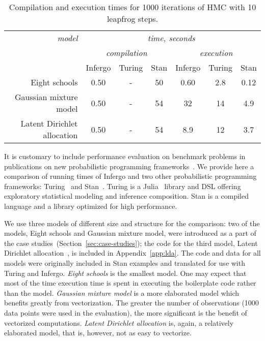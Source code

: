 \documentclass[sigplan,review,10pt,anonymous]{acmart}
\begin{document}
\begin{sloppypar}
\begin{table*}
	\begin{tabular}{r | c |  c | c | c | c | c | }
		{\it model}         & \multicolumn{6}{c|}{\it time, seconds} \\
					        & \multicolumn{3}{c|}{\it compilation} & \multicolumn{3}{c|}{\it execution} \\
					        & Infergo & Turing & Stan              & Infergo  & Turing & Stan    \\\hline
              Eight schools & 0.50    & -      & 50                & 0.60     & 2.8    & 0.12    \\
     Gaussian mixture model & 0.50    & -      & 54                & 32       & 14     & 4.9     \\
Latent Dirichlet allocation & 0.50    & -      & 54                & 8.9      & 12     & 3.7     \\ 
	\end{tabular}
\caption{Compilation and execution times for 1000 iterations 
	of HMC with 10 leapfrog steps.}
\label{tab:memory-runtime}
\end{table*}
It is customary to include performance evaluation on benchmark
problems in publications on new probabilistic programming
frameworks~\cite{PW14,WVM14,TMY+16,GXG18}. We provide here a
comparison of running times of Infergo and two other probabilistic
programming frameworks: Turing~\cite{GXG18} and
Stan~\cite{Stan17}. Turing is a Julia~\cite{Julia14} library
and DSL offering exploratory statistical modeling  and
inference composition. Stan is a compiled language and a library
optimized for high performance.

We use three models of different size and structure for the
comparison: two of the models, Eight schools and Gaussian
mixture model, were introduced as a part of the case
studies~(Section~\ref{sec:case-studies}); the code for the third
model, Latent Dirichlet allocation~\cite{BNG03}, is included in
Appendix~\ref{app:lda}. The code and data for all models were
originally included in Stan examples and translated for use
with Turing and Infergo. \textit{Eight schools} is the smallest model.
One may expect that most of the time execution time is spent in
executing the boilerplate code rather than the model. \textit{Gaussian
mixture model} is a more elaborated model which benefits greatly
from vectorization. The greater the number of observations (1000
data points were used in the evaluation), the more significant
is the benefit of vectorized computations. \textit{Latent
Dirichlet allocation} is, again, a relatively elaborated model,
that is, however, not as easy to vectorize. 


\end{sloppypar}
\end{document}
